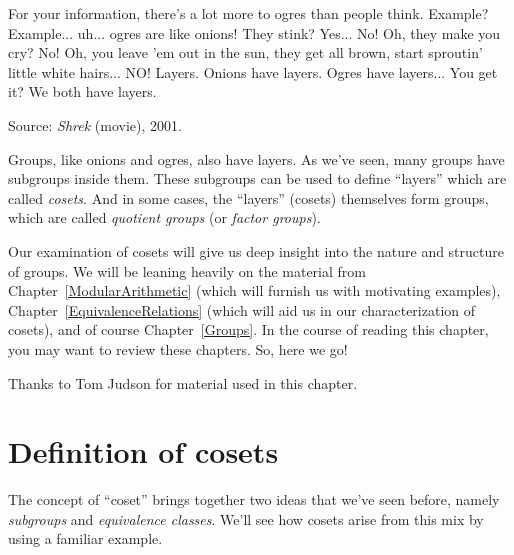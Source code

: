 
\begin{dialogue}
 For your information, there's a lot more to ogres than people think.
 Example?
 Example... uh... ogres are like onions!
 They stink?
 Yes... No!
 Oh, they make you cry?
 No!
 Oh, you leave 'em out in the sun, they get all brown, start sproutin' little white hairs...
  NO! Layers. Onions have layers. Ogres have layers... You get it? We both have layers.
\end{dialogue}
\medskip

\noindent
Source: \emph{Shrek} (movie), 2001.
\vspace{0.75 in}

Groups, like onions and ogres, also have layers. As we've seen, many groups have subgroups inside them. These subgroups can be used to define ``layers'' which are called \emph{cosets}. And in some cases, the ``layers'' (cosets) themselves form groups, which are called \emph{quotient groups} (or \emph{factor groups}). 

Our examination of cosets will give us deep insight into the nature and structure of groups. We will be leaning heavily on the material from Chapter~\ref{ModularArithmetic}  (which will furnish us with motivating examples), Chapter~\ref{EquivalenceRelations} (which will aid us in our characterization of cosets), and of course Chapter~\ref{Groups}.  In the course of reading this chapter, you may want to review these chapters.   So, here we go!
\medskip

Thanks to Tom Judson for material used in this chapter.

\section{Definition of cosets}
\label{sec:Cosets:Definition}

The concept of ``coset'' brings together two ideas that we've seen before, namely \emph{subgroups} and \emph{equivalence classes}. We'll see how cosets arise from this mix by using a familiar example.

